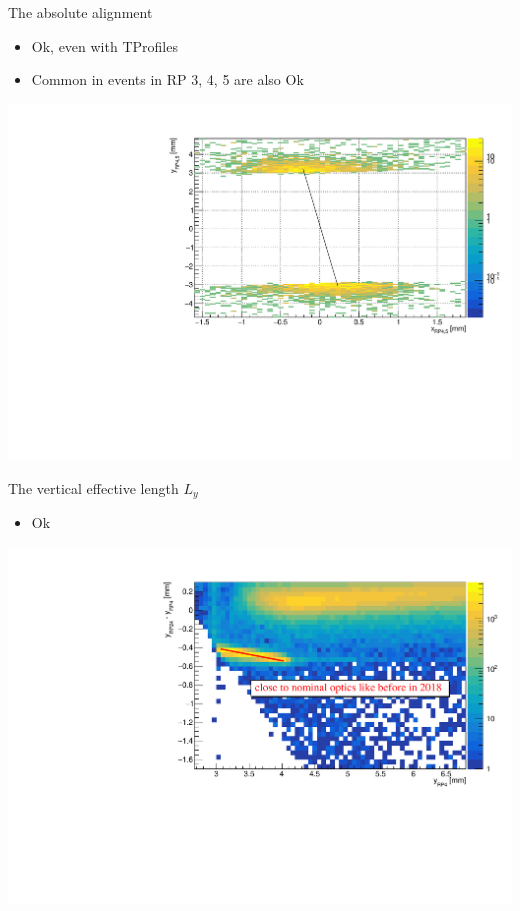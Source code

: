 \documentclass{beamer}
\begin{document}
\begin{frame}\scriptsize
	\begin{block}{The absolute alignment}
    		\begin{itemize}
			\item Ok, even with TProfiles 
			\item Common in events in RP 3, 4, 5 are also Ok
		\end{itemize}
             \includegraphics[width=1.0\textwidth]{Run_323316_130_murad_beta_star_0p25_m/elastic_for_meeting.pdf}\\
	\end{block}
	
\end{frame}

\begin{frame}\scriptsize
	\begin{block}{The vertical effective length $L_{y}$}
    		\begin{itemize}
			\item Ok
		\end{itemize}
             \includegraphics[width=1.0\textwidth]{Run_323316_130_murad_beta_star_0p25_m/optics_constraint_2018.pdf}\\
	\end{block}
	
\end{frame}
\end{document}
